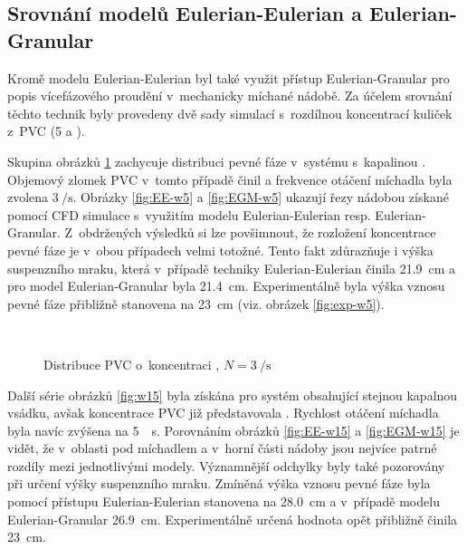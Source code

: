 \subsection{Srovnání modelů Eulerian-Eulerian a Eulerian-Granular}
Kromě modelu Eulerian-Eulerian byl také využit přístup Eulerian-Granular pro popis vícefázového proudění v~mechanicky míchané nádobě. Za účelem srovnání těchto technik byly provedeny dvě sady simulací s~rozdílnou koncentrací kuliček z~PVC (5 a ).

Skupina obrázků \ref{fig:w5} zachycuje distribuci pevné fáze v~systému s~kapalinou \pvpS{}. Objemový zlomek PVC v~tomto případě činil  a frekvence otáčení míchadla byla zvolena $\SI{3}{\per\second}$. Obrázky \ref{fig:EE-w5} a \ref{fig:EGM-w5} ukazují řezy nádobou získané pomocí CFD simulace s~využitím modelu Eulerian-Eulerian resp. Eulerian-Granular. Z~obdržených výsledků si lze povšimnout, že rozložení koncentrace pevné fáze je v~obou případech velmi totožné. Tento fakt zdůrazňuje i výška suspenzního mraku, která v~případě techniky Eulerian-Eulerian činila \SI{21.9}{\centi\meter} a pro model Eulerian-Granular byla \SI{21.4}{\centi\meter}. Experimentálně byla výška vznosu pevné fáze přibližně stanovena na \SI{23}{\centi\meter} (viz. obrázek \ref{fig:exp-w5}).

\begin{figure}[h!]
 \centering
  \qquad 
  \\
  \caption{Distribuce PVC o~koncentraci , $N=\SI{3}{\per\second}$}
  \label{fig:w5}
\end{figure}
Další série obrázků \ref{fig:w15} byla získána pro systém obsahující stejnou kapalnou vsádku, avšak koncentrace PVC již představovala . Rychlost otáčení míchadla byla navíc zvýšena na \SI{5}{\per\second}. Porovnáním obrázků \ref{fig:EE-w15} a \ref{fig:EGM-w15} je vidět, že v~oblasti pod míchadlem a v~horní části nádoby jsou nejvíce patrné rozdíly mezi jednotlivými modely. Významnější odchylky byly také pozorovány při určení výšky suspenzního mraku. Zmíněná výška vznosu pevné fáze byla pomocí přístupu Eulerian-Eulerian stanovena na \SI{28.0}{\centi\meter} a v~případě modelu Eulerian-Granular \SI{26.9}{\centi\meter}. Experimentálně určená hodnota opět přibližně činila \SI{23}{\centi\meter}. 

